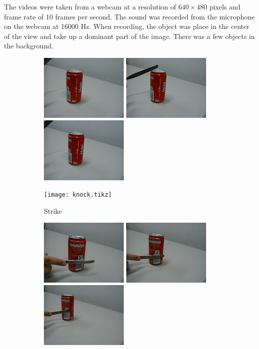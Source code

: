 \documentclass[letterpaper, 10 pt, conference]{ieeeconf}  %
\begin{document}
The videos were taken from a webcam at a resolution of $640 \times 480$ pixels and frame rate of 10 frames per second. The sound was recorded from the microphone on the webcam at 16000 Hz. When recording, the object was place in the center of the view and take up a dominant part of the image. There was a few objects in the background.

\begin{figure}[t]
  \centering
  \begin{subfigure}[b]{.8\linewidth}
    \centering
    \includegraphics[width=.25\linewidth]{knock0} \hspace{.4cm}
    \includegraphics[width=.25\linewidth]{knock1} \hspace{.4cm}
    \includegraphics[width=.25\linewidth]{knock2}

    \texttt{[image: knock.tikz]}
    \caption{Strike}
  \end{subfigure}

  \vspace{20pt}
  \begin{subfigure}[b]{.8\linewidth}
    \centering
    \includegraphics[width=.25\linewidth]{push0} \hspace{.4cm}
    \includegraphics[width=.25\linewidth]{push1} \hspace{.4cm}
    \includegraphics[width=.25\linewidth]{push2}


\end{subfigure}
\end{figure}
\end{document}
